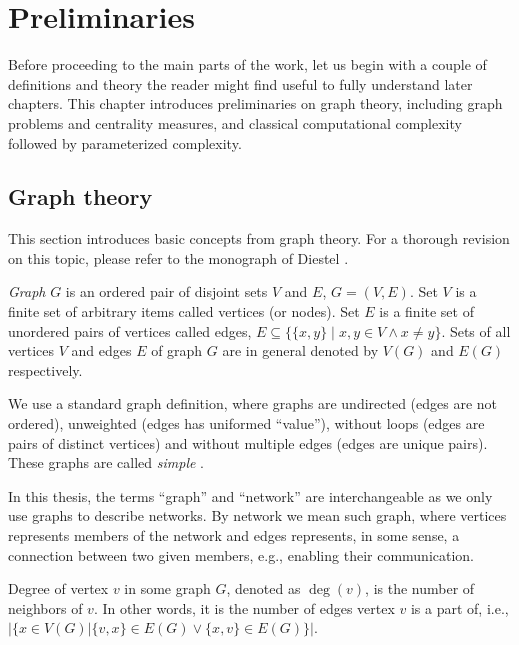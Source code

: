 \chapter{Preliminaries}

Before proceeding to the main parts of the work,
let us begin with a couple of definitions and theory the reader might find useful to fully understand later chapters.
This chapter introduces preliminaries on graph theory, including graph problems and centrality measures, and 
classical computational complexity followed by parameterized complexity.


\section{Graph theory}

This section introduces basic concepts from graph theory.
For a thorough revision on this topic, please refer to the monograph of Diestel \cite{Diestel2018}.

\begin{definition}[Graph]
    \emph{Graph} $G$ is an ordered pair of disjoint sets $V$ and $E$, $G=(V,E)$.
    Set $V$ is a finite set of arbitrary items called vertices (or nodes).
    Set $E$ is a finite set of unordered pairs of vertices called edges, $E \subseteq \{\{x,y\} \mid x,y \in V \wedge x \neq y\}$.
    Sets of all vertices $V$ and edges $E$ of graph $G$ are in general denoted by $V(G)$ and $E(G)$ respectively.
\end{definition}

We use a standard graph definition, where graphs are undirected (edges are not ordered),
unweighted (edges has uniformed ``value''), without loops (edges are pairs of distinct vertices) and
without multiple edges (edges are unique pairs).
These graphs are called \emph{simple} \cite[p.~29]{Diestel2018}.

In this thesis, the terms ``graph'' and ``network'' are interchangeable as we only use graphs to describe networks.
By network we mean such graph, where vertices represents members of the network 
and edges represents, in some sense, a connection between two given members, e.g., enabling their communication.

\begin{definition}
    Degree of vertex $v$ in some graph $G$, denoted as $\deg(v)$, is the number of neighbors of $v$.
    In other words, it is the number of edges vertex $v$ is a part of, i.e.,
    $\Big|\{x \in V(G) \vert \{v,x\} \in E(G) \vee \{x,v\} \in E(G)\}\Big|$.
\end{definition}

